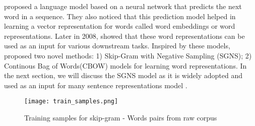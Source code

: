 \documentclass[12pt]{report} %
\begin{document}
\cite{bengio2003neural} proposed a language model based on a neural network that predicts the next word in a sequence. They also noticed that this prediction model helped in learning a vector representation for words called word embeddings or word representations.
Later in 2008, \cite{collobert2008unified} showed that these word representations can be used as an input for various downstream tasks.
Inspired by these models, \cite{mikolov2014word2vec} proposed two novel methods: 1) Skip-Gram with Negative Sampling (SGNS); 2) Continous Bag of Words(CBOW) models for learning word representations. In the next section, we will discuss the SGNS model as it is widely adopted and used as an input for many sentence representations model \citep{kiros2015skip}.

\begin{figure}[!tbp]
	\centering
	\texttt{[image: train\_samples.png]}
	\caption{Training samples for skip-gram - Words pairs from raw corpus}
	\label{train_sam}
\end{figure}

\end{document}
